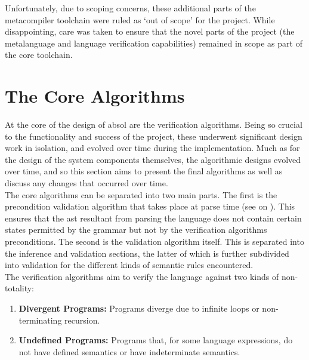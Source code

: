Unfortunately, due to scoping concerns, these additional parts of the metacompiler toolchain were ruled as `out of scope' for the project. 
While disappointing, care was taken to ensure that the novel parts of the project (the metalanguage and language verification capabilities) remained in scope as part of the core toolchain. 



\section{The Core Algorithms} %
\label{sec:the_core_algorithms}
At the core of the design of \gls{absol} are the verification algorithms. 
Being so crucial to the functionality and success of the project, these underwent significant design work in isolation, and evolved over time during the implementation.
Much as for the design of the system components themselves, the algorithmic designs evolved over time, and so this section aims to present the final algorithms as well as discuss any changes that occurred over time. \\

The core algorithms can be separated into two main parts.
The first is the precondition validation algorithm that takes place at parse time (see  on ).
This ensures that the \gls{ast} resultant from parsing the language does not contain certain states permitted by the grammar but not by the verification algorithms preconditions. 
The second is the validation algorithm itself.
This is separated into the inference and validation sections, the latter of which is further subdivided into validation for the different kinds of semantic rules encountered. \\

The verification algorithms aim to verify the language against two kinds of non-totality:
\begin{enumerate}
    \item \textbf{Divergent Programs:} Programs \gls{diverge} due to infinite loops or non-terminating recursion.
    \item \textbf{Undefined Programs:} Programs that, for some language expressions, do not have defined semantics or have indeterminate semantics.
\end{enumerate}

